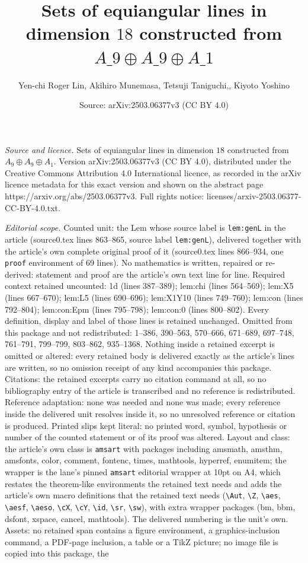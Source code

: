 \documentclass[10pt,a4paper]{amsart}
\title[Sets of equiangular lines in dimension $18$ constructed from]{Sets of equiangular lines in dimension $18$ constructed from $A\_9 \oplus A\_9 \oplus A\_1$}
\author{Yen-chi Roger Lin, Akihiro Munemasa, Tetsuji Taniguchi,, Kiyoto Yoshino}
\date{Source: arXiv:2503.06377v3 (CC BY 4.0)}
\begin{document}
\maketitle

\noindent\emph{Source and licence.} Sets of equiangular lines in dimension $18$ constructed from $A_9 \oplus A_9 \oplus A_1$. Version arXiv:2503.06377v3 (CC BY 4.0), distributed under the Creative Commons Attribution 4.0 International licence, as recorded in the arXiv licence metadata for this exact version and shown on the abstract page https://arxiv.org/abs/2503.06377v3. Full rights notice: licenses/arxiv-2503.06377-CC-BY-4.0.txt.\par\smallskip

\noindent\textit{Editorial scope.} Counted unit: the Lem whose source label is \texttt{lem:genL} in the article (source0.tex lines 863--865, source label \texttt{lem:genL}), delivered together with the article's own complete original proof of it (source0.tex lines 866--934, one \texttt{proof} environment of 69 lines). No mathematics is written, repaired or re-derived: statement and proof are the article's own text line for line. Required context retained uncounted: 1d (lines 387--389); lem:chi (lines 564--569); lem:X5 (lines 667--670); lem:L5 (lines 690--696); lem:X1Y10 (lines 749--760); lem:con (lines 792--804); lem:con:Epm (lines 795--798); lem:con:0 (lines 800--802). Every definition, display and label of those lines is retained unchanged. Omitted from this package and not redistributed: 1--386, 390--563, 570--666, 671--689, 697--748, 761--791, 799--799, 803--862, 935--1368. Nothing inside a retained excerpt is omitted or altered: every retained body is delivered exactly as the article's lines are written, so no omission receipt of any kind accompanies this package. Citations: the retained excerpts carry no citation command at all, so no bibliography entry of the article is transcribed and no reference is redistributed. Reference adaptation: none was needed and none was made; every reference inside the delivered unit resolves inside it, so no unresolved reference or citation is produced. Printed slips kept literal: no printed word, symbol, hypothesis or number of the counted statement or of its proof was altered. Layout and class: the article's own class is \texttt{amsart} with packages including amsmath, amsthm, amsfonts, color, comment, fontenc, times, mathtools, hyperref, enumitem; the wrapper is the lane's pinned \texttt{amsart} editorial wrapper at 10pt on A4, which restates the theorem-like environments the retained text needs and adds the article's own macro definitions that the retained text needs (\texttt{\textbackslash Aut}, \texttt{\textbackslash Z}, \texttt{\textbackslash aes}, \texttt{\textbackslash aesf}, \texttt{\textbackslash aeso}, \texttt{\textbackslash cX}, \texttt{\textbackslash cY}, \texttt{\textbackslash id}, \texttt{\textbackslash sr}, \texttt{\textbackslash sw}), with extra wrapper packages (bm, bbm, dsfont, xspace, cancel, mathtools). The delivered numbering is the unit's own. Assets: no retained span contains a figure environment, a graphics-inclusion command, a PDF-page inclusion, a table or a TikZ picture; no image file is copied into this package, the 
\end{document}
